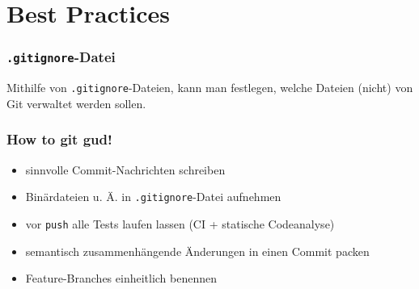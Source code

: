 \documentclass[
	ngerman, %
	aspectratio=169, %
	color={accentcolor=8b},
	colorframetitle=true,%
	authorontitle=true
]{tudabeamer}
\begin{document}
		
		
	\section{Best Practices}

			\begin{frame}
				\frametitle{\texttt{.gitignore}-Datei}
				Mithilfe von \texttt{.gitignore}-Dateien, kann man festlegen, welche Dateien (nicht) von Git verwaltet werden sollen.
				
			\end{frame}
			
			\begin{frame}
				\frametitle{How to git gud!}
					\begin{itemize}
						\item sinnvolle Commit-Nachrichten schreiben
						\item Binärdateien u. Ä. in \texttt{.gitignore}-Datei aufnehmen
						\item vor \texttt{push} alle Tests laufen lassen (CI + statische Codeanalyse)
						\item semantisch zusammenhängende Änderungen in einen Commit packen
						\item Feature-Branches einheitlich benennen
					\end{itemize}
			\end{frame}
			
		
\end{document}
